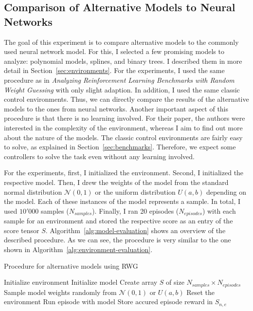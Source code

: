 \subsection{Comparison of Alternative Models to Neural Networks}
The goal of this experiment is to compare alternative models to the commonly used neural network model. For this, I selected a few promising models to analyze: polynomial models, splines, and binary trees. I described them in more detail in Section~\ref{sec:environments}. For the experiments, I used the same procedure as in \emph{Analyzing Reinforcement Learning Benchmarks with Random Weight Guessing} with only slight adaption. In addition, I used the same classic control environments. Thus, we can directly compare the results of the alternative models to the ones from neural networks. Another important aspect of this procedure is that there is no learning involved. For their paper, the authors were interested in the complexity of the environment, whereas I aim to find out more about the nature of the models. The classic control environments are fairly easy to solve, as explained in Section~\ref{sec:benchmarks}. Therefore, we expect some controllers to solve the task even without any learning involved.

For the experiments, first, I initialized the environment. Second, I initialized the respective model. Then, I drew the weights of the model from the standard normal distribution $\mathcal{N}(0,1)$ or the uniform distribution $U(a,b)$ depending on the model. Each of these instances of the model represents a sample. In total, I used $10'000$ samples ($N_{samples}$). Finally, I ran 20 episodes ($N_{episodes}$) with each sample for an environment and stored the respective score as an entry of the score tensor $S$. Algorithm~\ref{alg:model-evaluation} shows an overview of the described procedure. As we can see, the procedure is very similar to the one shown in Algorithm~\ref{alg:environment-evaluation}.
\begin{algorithm}
\caption{Procedure for alternative models using RWG}
\begin{algorithmic}[1]
\State Initialize environment
\State Initialize model
\State Create array $S$ of size $N_{samples} \times N_{episodes}$
    \State Sample model weights randomly from $\mathcal{N}(0,1)$ or $U(a, b)$
      \State Reset the environment
      \State Run episode with model
      \State Store accured episode reward in $S_{n,e}$
    \EndFor
\EndFor
\end{algorithmic}
\label{alg:model-evaluation}
\end{algorithm}

